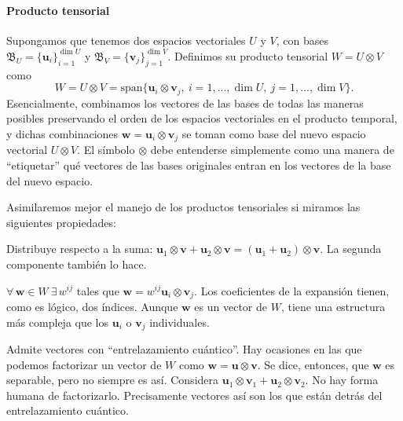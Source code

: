 \paragraph{Producto tensorial} Supongamos que tenemos dos espacios vectoriales \(U\) y \(V\), con bases \(\mathfrak{B}_U = \{\mathbf{u}_i\}_{i=1}^{\dim{U}}\) y \(\mathfrak{B}_V = \{\mathbf{v}_j\}_{j=1}^{\dim{V}}\). Definimos su producto tensorial \(W = U\otimes V\) como 
\begin{equation}
    W = U\otimes V = \text{span}\{\mathbf{u}_i\otimes\mathbf{v}_j,\ i=1, ..., \dim{U},\ j=1, ..., \dim{V}\}.
\end{equation}
Esencialmente, combinamos los vectores de las bases de todas las maneras posibles preservando el orden de los espacios vectoriales en el producto temporal, y dichas combinaciones \(\mathbf{w} = \mathbf{u}_i\otimes\mathbf{v}_j\) se toman como base del nuevo espacio vectorial \(U\otimes V\). El símbolo \(\otimes\) debe entenderse simplemente como una manera de ``etiquetar'' qué vectores de las bases originales entran en los vectores de la base del nuevo espacio.

Asimilaremos mejor el manejo de los productos tensoriales si miramos las siguientes propiedades:
\begin{myitemize}
    \item Distribuye respecto a la suma: \(\mathbf{u}_1\otimes\mathbf{v}+\mathbf{u}_2\otimes\mathbf{v} = (\mathbf{u}_1+\mathbf{u}_2)\otimes\mathbf{v}\). La segunda componente también lo hace.
    \item \(\forall\, \mathbf{w}\in W\ \exists\, w^{ij}\) tales que \(\mathbf{w}=w^{ij}\mathbf{u}_i\otimes\mathbf{v}_j\). Los coeficientes de la expansión tienen, como es lógico, dos índices. Aunque \(\mathbf{w}\) es un vector de \(W\), tiene una estructura más compleja que los \(\mathbf{u}_i\) o \(\mathbf{v}_j\) individuales. 
    \item Admite vectores con ``entrelazamiento cuántico''. Hay ocasiones en las que podemos factorizar un vector de \(W\) como \(\mathbf{w} = \mathbf{u}\otimes\mathbf{v}\). Se dice, entonces, que \(\mathbf{w}\) es separable, pero no siempre es así. Considera \(\mathbf{u}_1\otimes\mathbf{v}_1 + \mathbf{u}_2\otimes\mathbf{v}_2\). No hay forma humana de factorizarlo. Precisamente vectores así son los que están detrás del entrelazamiento cuántico.
\end{myitemize}  

